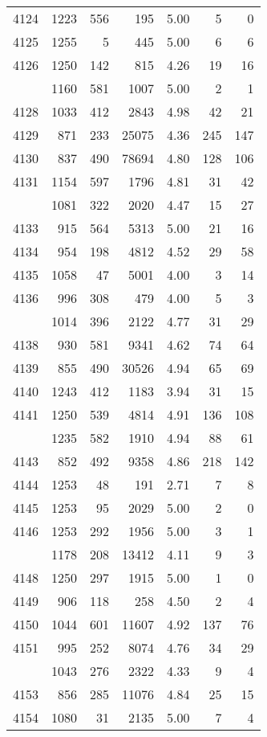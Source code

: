 \documentclass[
]{article}
\begin{document}
\begin{table}
\begin{tabular}[t]{lrrrrrr}
4124 & 1223 & 556 & 195 & 5.00 & 5 & 0\\
4125 & 1255 & 5 & 445 & 5.00 & 6 & 6\\
4126 & 1250 & 142 & 815 & 4.26 & 19 & 16\\
\addlinespace
4127 & 1160 & 581 & 1007 & 5.00 & 2 & 1\\
4128 & 1033 & 412 & 2843 & 4.98 & 42 & 21\\
4129 & 871 & 233 & 25075 & 4.36 & 245 & 147\\
4130 & 837 & 490 & 78694 & 4.80 & 128 & 106\\
4131 & 1154 & 597 & 1796 & 4.81 & 31 & 42\\
\addlinespace
4132 & 1081 & 322 & 2020 & 4.47 & 15 & 27\\
4133 & 915 & 564 & 5313 & 5.00 & 21 & 16\\
4134 & 954 & 198 & 4812 & 4.52 & 29 & 58\\
4135 & 1058 & 47 & 5001 & 4.00 & 3 & 14\\
4136 & 996 & 308 & 479 & 4.00 & 5 & 3\\
\addlinespace
4137 & 1014 & 396 & 2122 & 4.77 & 31 & 29\\
4138 & 930 & 581 & 9341 & 4.62 & 74 & 64\\
4139 & 855 & 490 & 30526 & 4.94 & 65 & 69\\
4140 & 1243 & 412 & 1183 & 3.94 & 31 & 15\\
4141 & 1250 & 539 & 4814 & 4.91 & 136 & 108\\
\addlinespace
4142 & 1235 & 582 & 1910 & 4.94 & 88 & 61\\
4143 & 852 & 492 & 9358 & 4.86 & 218 & 142\\
4144 & 1253 & 48 & 191 & 2.71 & 7 & 8\\
4145 & 1253 & 95 & 2029 & 5.00 & 2 & 0\\
4146 & 1253 & 292 & 1956 & 5.00 & 3 & 1\\
\addlinespace
4147 & 1178 & 208 & 13412 & 4.11 & 9 & 3\\
4148 & 1250 & 297 & 1915 & 5.00 & 1 & 0\\
4149 & 906 & 118 & 258 & 4.50 & 2 & 4\\
4150 & 1044 & 601 & 11607 & 4.92 & 137 & 76\\
4151 & 995 & 252 & 8074 & 4.76 & 34 & 29\\
\addlinespace
4152 & 1043 & 276 & 2322 & 4.33 & 9 & 4\\
4153 & 856 & 285 & 11076 & 4.84 & 25 & 15\\
4154 & 1080 & 31 & 2135 & 5.00 & 7 & 4\\

\end{tabular}
\end{table}
\end{document}
